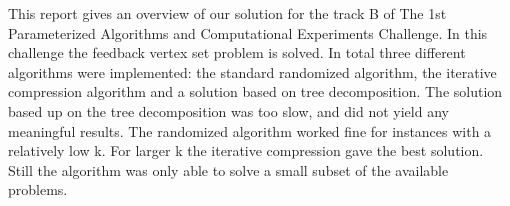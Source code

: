 This report gives an overview of our solution for the track B of The 1st Parameterized Algorithms and Computational Experiments Challenge. In this challenge the feedback vertex set problem is solved. In total three different algorithms were implemented: the standard randomized algorithm, the iterative compression algorithm and a solution based on tree decomposition. The solution based up on the tree decomposition was too slow, and did not yield any meaningful results. The randomized algorithm worked fine for instances with a relatively low k.  For larger k the iterative compression gave the best solution. Still the algorithm was only able to solve a small subset of the available problems. 